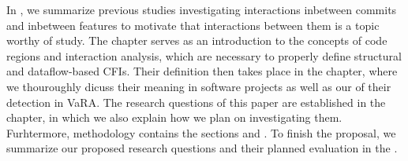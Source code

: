 In , we summarize previous studies investigating interactions inbetween commits and inbetween features to motivate that interactions between them is a topic worthy of study.
The  chapter serves as an introduction to the concepts of code regions and interaction analysis, which are necessary to properly define structural and dataflow-based CFIs.
Their definition then takes place in the  chapter, where we thouroughly dicuss their meaning in software projects as well as our  of their detection in VaRA.
The research questions of this paper are established in the  chapter, in which we also explain how we plan on investigating them.
Furhtermore, methodology contains the sections  and .
To finish the proposal, we summarize our proposed research questions and their planned evaluation in the .
